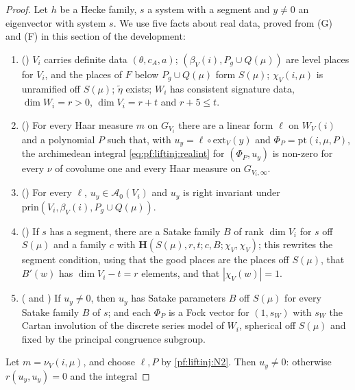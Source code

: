 \begin{proof}
Let $h$ be a Hecke family, $s$ a system with a segment and $y\ne0$ an eigenvector with system $s$. We use five facts about real data, proved
from (G) and (F) in this section of the development:
\begin{enumerate}[label=(N\arabic*)]
\item\label{pf:liftinj:N1} () $V_i$ carries definite data
$(\theta,c_A,a)$; $(\beta_V(i),P_g\cup Q(\mu))$ are level places for $V_i$, and the places of $F$ below $P_g\cup Q(\mu)$ form $S(\mu)$;
$\chi_V(i,\mu)$ is unramified off $S(\mu)$; $\tilde\eta$ exists; $W_i$ has consistent signature data, $\dim W_i=r>0$, $\dim V_i=r+t$ and $r+5\le t$.
\item\label{pf:liftinj:N2} () For every Haar measure $m$ on $G_{V_i}$
there are a linear form $\ell$ on $W_V(i)$ and a polynomial $P$ such that, with $u_y=\ell\circ\mathrm{ext}_V(y)$ and $\Phi_P=\mathrm{pt}(i,\mu,P)$,
the archimedean integral \eqref{eq:pf:liftinj:realint} for $(\Phi_P,u_y)$ is non-zero for every $\nu$ of covolume one and every Haar measure on
$G_{V_i,\infty}$.
\item\label{pf:liftinj:N3} () For every $\ell$, $u_y\in\mathcal A_0(V_i)$ and
$u_y$ is right invariant under $\mathrm{prin}(V_i,\beta_V(i),P_g\cup Q(\mu))$.
\item\label{pf:liftinj:N4} () If $s$ has a segment, there are a Satake
family $B$ of rank $\dim V_i$ for $s$ off $S(\mu)$ and a family $c$ with $\mathbf H(S(\mu),r,t;c,B;\chi_V,\chi_V)$; this rewrites the segment
condition, using that the good places are the places off $S(\mu)$, that $B'(w)$ has $\dim V_i-t=r$ elements, and that $|\chi_V(w)|=1$.
\item\label{pf:liftinj:N5} ( and
) If $u_y\ne0$, then $u_y$ has Satake parameters $B$ off $S(\mu)$ for every
Satake family $B$ of $s$; and each $\Phi_P$ is a Fock vector for $(1,s_W)$ with $s_W$ the Cartan involution of the discrete series model of $W_i$,
spherical off $S(\mu)$ and fixed by the principal congruence subgroup.
\end{enumerate}
Let $m=\nu_V(i,\mu)$, and choose $\ell,P$ by \ref{pf:liftinj:N2}. Then $u_y\ne0$: otherwise $r(u_y,u_y)=0$ and the integral

\end{proof}
